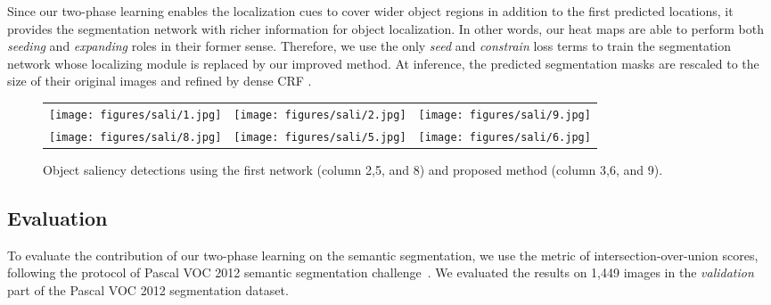 \documentclass[10pt,twocolumn,letterpaper]{article}
\begin{document}
Since our two-phase learning enables the localization cues to cover wider object regions in addition to the first predicted locations, it provides the segmentation network with richer information for object localization. In other words, our heat maps are able to perform both \textit{seeding} and \textit{expanding} roles in their former sense. Therefore, we use the only \textit{seed} and \textit{constrain} loss terms to train the segmentation network whose localizing module is replaced by our improved method. At inference, the predicted segmentation masks are rescaled to the size of their original images and refined by dense CRF \cite{ToyodaH08crf}.


\begin{figure*}
\begin{center}
\def\arraystretch{0.5}
\begin{tabular}{@{}c@{\hskip 0.01\linewidth}c@{\hskip 0.01\linewidth}c}
\texttt{[image: figures/sali/1.jpg]} &
\texttt{[image: figures/sali/2.jpg]} &
\texttt{[image: figures/sali/9.jpg]} \\
\texttt{[image: figures/sali/8.jpg]} &
\texttt{[image: figures/sali/5.jpg]} &
\texttt{[image: figures/sali/6.jpg]} \\
\end{tabular}
\end{center}
\vspace{-0.1in}
\caption{Object saliency detections using the first network (column 2,5, and 8) and proposed method (column 3,6, and 9).}
\label{fig:saliency}
\end{figure*}

\subsection{Evaluation}
To evaluate the contribution of our two-phase learning on the semantic segmentation, we use the metric of intersection-over-union scores, following the protocol of Pascal VOC 2012 semantic segmentation challenge~\cite{Everingham10voc}. We evaluated the results on 1,449 images in the \textit{validation} part of the Pascal VOC 2012 segmentation dataset.
\end{document}
